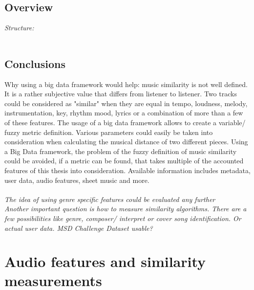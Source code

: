\section{Overview}

\textit{Structure: \\}
\ \\
\begin{figure}[htbp]
	\centering
\end{figure}

\section{Conclusions}

Why using a big data framework would help: 
music similarity is not well defined. It is a rather subjective value that differs from listener to listener. 
Two tracks could be considered as "similar" when they are equal in tempo, loudness, melody, instrumentation, key, rhythm mood, lyrics or a combination of more than a few of these features. The usage of a big data framework allows to create a variable/ fuzzy metric definition. Various parameters could easily be taken into consideration when calculating the musical distance of two different pieces. 
Using a Big Data framework, the problem of the fuzzy definition of music similarity could be avoided, if a metric can be found, that takes multiple of the accounted features of this thesis into consideration.
Available information includes metadata, user data, audio features, sheet music and more.\\
\textit{\ \\
The idea of using genre specific features could be evaluated any further
\ \\
Another important question is how to measure similarity algorithms. 
There are a few possibilities like genre, composer/ interpret or cover song identification. Or actual user data. MSD Challenge Dataset usable?\cite{msdchallenge1}\\}

\chapter{Audio features and similarity measurements}\label{audiofeat}

